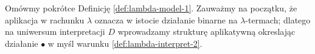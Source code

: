 \begin{definicja}


\end{definicja}

Omówmy pokrótce Definicję \ref{def:lambda-model-1}. Zauważmy na początku, że aplikacja w rachunku \(\lambda\) oznacza w istocie działanie binarne na \(\lambda\)-termach; dlatego na uniwersum interpretacji \(D\) wprowadzamy strukturę aplikatywną okreslając działanie \(\bullet\) w myśl warunku \ref{def:lambda-interpret-2}. 


